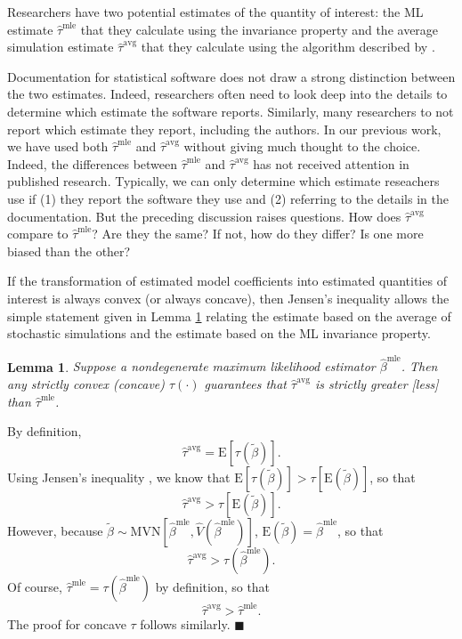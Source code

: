 \documentclass[11pt]{article}
\newtheorem{lemma}{Lemma}
\newenvironment{proof}[1][Proof]{\begin{trivlist}
\item[\hskip \labelsep {\bfseries #1}]}{\end{trivlist}}
\begin{document}
Researchers have two potential estimates of the quantity of interest: the ML estimate $\hat{\tau}^\text{mle}$ that they calculate using the invariance property and the average simulation estimate $\hat{\tau}^\text{avg}$ that they calculate using the algorithm described by \cite{KingTomzWittenberg2000}. 

Documentation for statistical software does not draw a strong distinction between the two estimates.
Indeed, researchers often need to look deep into the details to determine which estimate the software reports.
Similarly, many researchers to not report which estimate they report, including the authors. In our previous work, we have used both $\hat{\tau}^\text{mle}$ and $\hat{\tau}^\text{avg}$ without giving much thought to the choice.
Indeed, the differences between $\hat{\tau}^\text{mle}$ and $\hat{\tau}^\text{avg}$ has not received attention in published research. 
Typically, we can only determine which estimate reseachers use if (1) they report the software they use and (2) referring to the details in the documentation. 
But the preceding discussion raises questions.
How does $\hat{\tau}^\text{avg}$ compare to $\hat{\tau}^{\text{mle}}$? 
Are they the same? 
If not, how do they differ? 
Is one more biased than the other?

If the transformation of estimated model coefficients into estimated quantities of interest is always convex (or always concave), then Jensen's inequality allows the simple statement given in Lemma \ref{lem:direction} relating the estimate based on the average of stochastic simulations and the estimate based on the ML invariance property.

\begin{lemma}\label{lem:direction}
Suppose a nondegenerate maximum likelihood estimator $\hat{\beta}^\text{mle}$.
Then any strictly convex (concave) $\tau(\cdot)$ guarantees that $\hat{\tau}^{\text{avg}}$ is strictly greater [less] than $\hat{\tau}^\text{mle}$.
\end{lemma}
\begin{proof}
By definition, $$ \hat{\tau}^{\text{avg}} = \text{E}\left[ \tau \left(\tilde{\beta} \right) \right].$$
Using Jensen's inequality \citep[p. 190, Thm. 4.7.7]{CasellaBerger2002}, we know that $\text{E}\left[ \tau \left(\tilde{\beta} \right) \right] > \tau \left[ \text{E}\left( \tilde{\beta} \right) \right]$, so that $$\hat{\tau}^{\text{avg}} > \tau \left[ \text{E}\left( \tilde{\beta} \right) \right].$$
However, because $\tilde{\beta} \sim \text{MVN} \left[ \hat{\beta}^{\text{mle}}, \hat{V} \left( \hat{\beta}^{\text{mle}} \right) \right]$, $\text{E}\left( \tilde{\beta} \right) = \hat{\beta}^\text{mle}$, so that
$$\hat{\tau}^{\text{avg}} > \tau \left( \hat{\beta}^\text{mle}\right).$$
Of course, $\hat{\tau}^\text{mle} = \tau \left( {\hat{\beta}^\text{mle}} \right)$ by definition, so that $$\hat{\tau}^{\text{avg}} > \hat{\tau}^\text{mle}.$$
The proof for concave $\tau$ follows similarly.
 $\blacksquare$
\end{proof}
\end{document}
